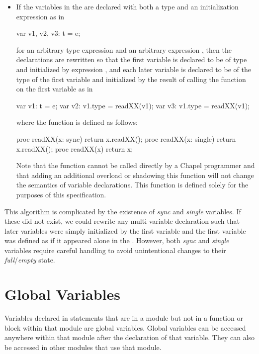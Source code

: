 \begin{itemize}
\item If the variables in the  are declared
with both a type and an initialization expression as in
\begin{chapel}
var v1, v2, v3: t = e;
\end{chapel}
for an arbitrary type expression  and an arbitrary
expression , then the declarations are rewritten so that the
first variable is declared to be of type  and initialized by
expression , and each later variable is declared to be of the
type of the first variable and initialized by the result of calling
the function  on the first variable as in
\begin{chapel}
var v1: t = e; var v2: v1.type = readXX(v1); var v3: v1.type = readXX(v1);
\end{chapel}
where the function  is defined as follows:
\begin{chapel}
proc readXX(x: sync) return x.readXX();
proc readXX(x: single) return x.readXX();
proc readXX(x) return x;
\end{chapel}
Note that the  function cannot be called directly by a
Chapel programmer and that adding an additional overload or shadowing
this function will not change the semantics of variable declarations.
This function is defined solely for the purposes of this
specification.
\end{itemize}

\begin{rationale}
This algorithm is complicated by the existence of \emph{sync}
and \emph{single} variables.  If these did not exist, we could rewrite
any multi-variable declaration such that later variables were simply
initialized by the first variable and the first variable was defined
as if it appeared alone in the .  However,
both \emph{sync} and \emph{single} variables require careful handling
to avoid unintentional changes to their \emph{full}/\emph{empty}
state.
\end{rationale}

\section{Global Variables}
\label{Global_Variables}

Variables declared in statements that are in a module but not in a
function or block within that module are global variables.  Global
variables can be accessed anywhere within that module after the
declaration of that variable.  They can also be accessed in other
modules that use that module.

